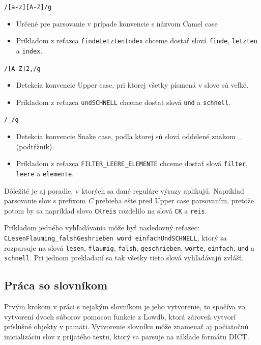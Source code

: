 \documentclass[
  digital, %
  table,   %
  lof,     %
  lot,     %
]{fithesis3}
\begin{document}
\noindent
\texttt{/[a-z][A-Z]/g}
\begin{itemize}
\item Určené pre parsovanie v prípade konvencie s názvom Camel case
\item Príkladom z reťazca \texttt{findeLetztenIndex} chceme dostať slová \texttt{finde}, \texttt{letzten} a \texttt{index}.
\end{itemize}

\noindent
\texttt{/[A-Z]{2,}/g}
\begin{itemize}
\item Detekcia konvencie Upper case, pri ktorej všetky písmená v slove sú veľké.
\item Príkladom z reťazca \texttt{undSCHNELL} chceme dostať slová \texttt{und} a \texttt{schnell}.
\end{itemize}

\noindent
\texttt{/\_/g}
\begin{itemize}
\item Detekcia konvencie Snake case, podľa ktorej sú slová oddelené znakom \_ (podtŕžnik).
\item Príkladom z reťazca \texttt{FILTER\_LEERE\_ELEMENTE} chceme dostať slová \texttt{filter}, \texttt{leere} a \texttt{elemente}.
\end{itemize}

Dôležité je aj poradie, v ktorých sa dané reguláre výrazy aplikujú. Napríklad parsovanie slov s prefixom \textit{C} prebieha ešte pred Upper case parsovaním, pretože potom by sa napríklad slovo \texttt{CKreis} rozdelilo na slová \texttt{CK} a \texttt{reis}.

Príkladom jedného vyhľadávania môže byť nasledovný reťazec: \texttt{CLesenFlauming\_falshGeshrieben word einfachUndSCHNELL}, ktorý sa rozparsuje na slová \texttt{lesen}, \texttt{flaumig}, \texttt{falsh}, \texttt{geschrieben}, \texttt{worte}, \texttt{einfach}, \texttt{und} a \texttt{schnell}. Pri jednom prekladaní sa tak všetky tieto slová vyhľadávajú zvlášť.

\subsection{Práca so slovníkom}
Prvým krokom v práci s nejakým slovníkom je jeho vytvorenie, to spočíva vo vytvorení dvoch súborov pomocou funkcie z Lowdb, ktorá zároveň vytvorí príslušné objekty v pamäti. Vytvorenie slovníku môže znamenať aj počiatočnú inicializáciu slov z prijatého textu, ktorý sa parsuje na základe formátu DICT.
\end{document}
